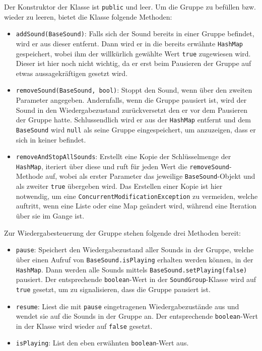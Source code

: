 \begin{sloppypar}
Der Konstruktor der Klasse ist \texttt{public} und leer.
Um die Gruppe zu befüllen bzw. wieder zu leeren, bietet
die Klasse folgende Methoden:

\begin{itemize}
	\item \texttt{addSound(BaseSound)}: Falls sich der Sound bereits
	      in einer Gruppe befindet, wird er aus dieser entfernt. Dann
	      wird er in die bereits erwähnte \texttt{HashMap} gespeichert,
	      wobei ihm der willkürlich gewählte Wert \texttt{true} zugewiesen
	      wird. Dieser ist hier noch nicht wichtig, da er erst beim Pausieren
	      der Gruppe auf etwas aussagekräftigen gesetzt wird.
	\item \texttt{removeSound(BaseSound, bool)}: Stoppt den Sound, wenn
	      über den zweiten Parameter angegeben. Andernfalls, wenn die
	      Gruppe pausiert ist, wird der Sound in den Wiedergabezustand
	      zurückversetzt den er vor dem Pausieren der Gruppe hatte.
	      Schlussendlich wird er aus der \texttt{HashMap} entfernt und
	      dem \texttt{BaseSound} wird \texttt{null} als seine Gruppe
	      eingespeichert, um anzuzeigen, dass er sich in keiner befindet.
	\item \texttt{removeAndStopAllSounds}: Erstellt eine Kopie der Schlüsselmenge
	      der \texttt{HashMap}, iteriert über diese und ruft für jeden Wert
	      die \texttt{removeSound}-Methode auf, wobei als erster Parameter
	      das jeweilige \texttt{BaseSound}-Objekt und als zweiter \texttt{true}
	      übergeben wird. Das Erstellen einer Kopie ist hier notwendig, um
	      eine \texttt{ConcurrentModificationException} zu vermeiden, welche
	      auftritt, wenn eine Liste oder eine Map geändert wird, während
	      eine Iteration über sie im Gange ist.
\end{itemize}

Zur Wiedergabesteuerung der Gruppe stehen folgende drei Methoden bereit:

\begin{itemize}
	\item \texttt{pause}: Speichert den Wiedergabezustand aller Sounds in der
	      Gruppe, welche über einen Aufruf von \texttt{BaseSound.isPlaying}
	      erhalten werden können, in der \texttt{HashMap}. Dann werden alle
	      Sounds mittels \texttt{BaseSound.setPlaying(false)} pausiert.
	      Der entsprechende \texttt{boolean}-Wert in der \texttt{SoundGroup}-Klasse
	      wird auf \texttt{true} gesetzt, um zu signalisieren, dass die Gruppe
	      pausiert ist.
	\item \texttt{resume}: Liest die mit \texttt{pause} eingetragenen Wiedergabezustände
	      aus und wendet sie auf die Sounds in der Gruppe an. Der entsprechende
	      \texttt{boolean}-Wert in der Klasse wird wieder auf \texttt{false}
	      gesetzt.
	\item \texttt{isPlaying}: List den eben erwähnten \texttt{boolean}-Wert aus.
\end{itemize}


\end{sloppypar}
